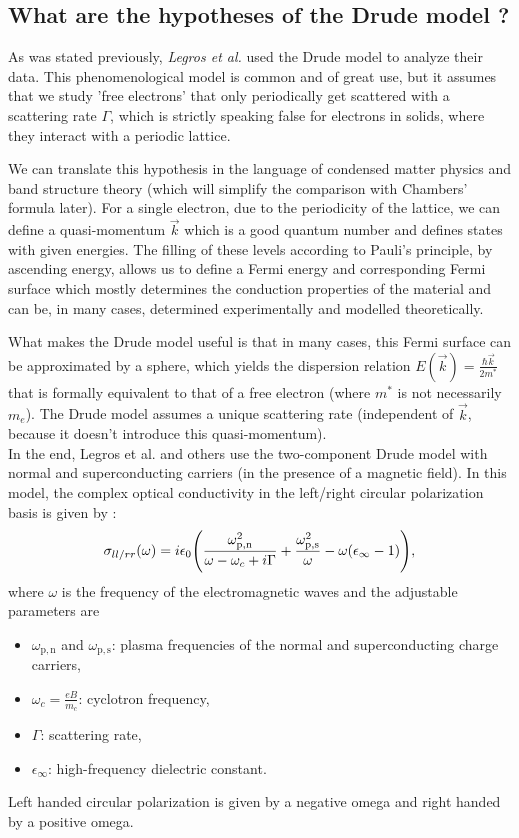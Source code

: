 \subsection{What are the hypotheses of the Drude model ?}
As was stated previously, \textit{Legros et al.} used the Drude model to analyze their data. 
This phenomenological model is common and of great use, but it assumes that we study 'free electrons' that only periodically get scattered with a scattering rate $\Gamma$, 
which is strictly speaking false for electrons in solids, 
where they interact with a periodic lattice.

We can translate this hypothesis in the language of condensed matter physics and band structure theory (which will simplify the comparison with Chambers' formula later). 
For a single electron, due to the periodicity of the lattice, 
we can define a quasi-momentum $\vec{k}$ which is a good quantum number and defines states with given energies. 
The filling of these levels according to Pauli's principle, by ascending energy, 
allows us to define a Fermi energy and corresponding Fermi surface 
which mostly determines the conduction properties of the material and can be, 
in many cases, determined experimentally and modelled theoretically.

What makes the Drude model useful is that in many cases, 
this Fermi surface can be approximated by a sphere, which yields the dispersion relation $E(\vec{k}) = \frac{\hbar\vec{k}}{2m^*}$ 
that is formally equivalent to that of a free electron (where $m^*$ is not necessarily $m_e$). 
The Drude model assumes a unique scattering rate (independent of $\vec{k}$, because it doesn't introduce this quasi-momentum). \\

In the end, Legros et al.\cite{legros2022} and others\cite{post2021} use the two-component Drude model with normal and superconducting carriers (in the presence of a magnetic field). 
In this model, the complex optical conductivity in the left/right circular polarization basis is given by :
\begin{equation}
    \sigma_{ll/rr}(\omega) = i\epsilon_0\qty(
        \frac{\omega^2_{\mathrm{p,n}}}{\omega-\omega_c+i\Gamma}
        + \frac{\omega^2_{\mathrm{p,s}}}{\omega} - \omega(\epsilon_{\infty} - 1)),
\end{equation}
where $\omega$ is the frequency of the electromagnetic waves and the adjustable parameters are
\begin{itemize}
    \item $\omega_{\mathrm{p,n}}$ and $\omega_{\mathrm{p,s}}$: plasma frequencies of the normal and
        superconducting charge carriers,
    \item $\omega_c = \frac{eB}{m_c}$: cyclotron frequency,
    \item $\Gamma$: scattering rate,
    \item $\epsilon_{\infty}$: high-frequency dielectric constant.
\end{itemize}
Left handed circular polarization is given by a negative omega and right handed by a positive omega.


